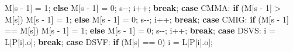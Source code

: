 \documentclass[
  brazilian,
  letterpaper,
]{book}
\newenvironment{Shaded}{\begin{snugshade}}{\end{snugshade}}
\newcommand{\ControlFlowTok}[1]{\textcolor[rgb]{0.00,0.23,0.31}{\textbf{#1}}}
\newcommand{\DecValTok}[1]{\textcolor[rgb]{0.68,0.00,0.00}{#1}}
\newcommand{\NormalTok}[1]{\textcolor[rgb]{0.00,0.23,0.31}{#1}}
\newcommand{\OperatorTok}[1]{\textcolor[rgb]{0.37,0.37,0.37}{#1}}
\theoremstyle{plain}
\theoremstyle{definition}
\theoremstyle{remark}
\begin{document}
\begin{Shaded}
\begin{Highlighting}[]
\NormalTok{                M}\OperatorTok{[}\NormalTok{s }\OperatorTok{{-}} \DecValTok{1}\OperatorTok{]} \OperatorTok{=} \DecValTok{1}\OperatorTok{;}
            \ControlFlowTok{else}
\NormalTok{                M}\OperatorTok{[}\NormalTok{s }\OperatorTok{{-}} \DecValTok{1}\OperatorTok{]} \OperatorTok{=} \DecValTok{0}\OperatorTok{;}
\NormalTok{            s}\OperatorTok{{-}{-};}
\NormalTok{            i}\OperatorTok{++;}
            \ControlFlowTok{break}\OperatorTok{;}
        \ControlFlowTok{case}\NormalTok{ CMMA}\OperatorTok{:}
            \ControlFlowTok{if} \OperatorTok{(}\NormalTok{M}\OperatorTok{[}\NormalTok{s }\OperatorTok{{-}} \DecValTok{1}\OperatorTok{]} \OperatorTok{\textgreater{}}\NormalTok{ M}\OperatorTok{[}\NormalTok{s}\OperatorTok{])}
\NormalTok{                M}\OperatorTok{[}\NormalTok{s }\OperatorTok{{-}} \DecValTok{1}\OperatorTok{]} \OperatorTok{=} \DecValTok{1}\OperatorTok{;}
            \ControlFlowTok{else}
\NormalTok{                M}\OperatorTok{[}\NormalTok{s }\OperatorTok{{-}} \DecValTok{1}\OperatorTok{]} \OperatorTok{=} \DecValTok{0}\OperatorTok{;}
\NormalTok{            s}\OperatorTok{{-}{-};}
\NormalTok{            i}\OperatorTok{++;}
            \ControlFlowTok{break}\OperatorTok{;}
        \ControlFlowTok{case}\NormalTok{ CMIG}\OperatorTok{:}
            \ControlFlowTok{if} \OperatorTok{(}\NormalTok{M}\OperatorTok{[}\NormalTok{s }\OperatorTok{{-}} \DecValTok{1}\OperatorTok{]} \OperatorTok{==}\NormalTok{ M}\OperatorTok{[}\NormalTok{s}\OperatorTok{])}
\NormalTok{                M}\OperatorTok{[}\NormalTok{s }\OperatorTok{{-}} \DecValTok{1}\OperatorTok{]} \OperatorTok{=} \DecValTok{1}\OperatorTok{;}
            \ControlFlowTok{else}
\NormalTok{                M}\OperatorTok{[}\NormalTok{s }\OperatorTok{{-}} \DecValTok{1}\OperatorTok{]} \OperatorTok{=} \DecValTok{0}\OperatorTok{;}
\NormalTok{            s}\OperatorTok{{-}{-};}
\NormalTok{            i}\OperatorTok{++;}
            \ControlFlowTok{break}\OperatorTok{;}
        \ControlFlowTok{case}\NormalTok{ DSVS}\OperatorTok{:}
\NormalTok{            i }\OperatorTok{=}\NormalTok{ L}\OperatorTok{[}\NormalTok{P}\OperatorTok{[}\NormalTok{i}\OperatorTok{].}\NormalTok{o}\OperatorTok{];}
            \ControlFlowTok{break}\OperatorTok{;}
        \ControlFlowTok{case}\NormalTok{ DSVF}\OperatorTok{:}
            \ControlFlowTok{if} \OperatorTok{(}\NormalTok{M}\OperatorTok{[}\NormalTok{s}\OperatorTok{]} \OperatorTok{==} \DecValTok{0}\OperatorTok{)}
\NormalTok{                i }\OperatorTok{=}\NormalTok{ L}\OperatorTok{[}\NormalTok{P}\OperatorTok{[}\NormalTok{i}\OperatorTok{].}\NormalTok{o}\OperatorTok{];}

\end{Highlighting}
\end{Shaded}
\end{document}
